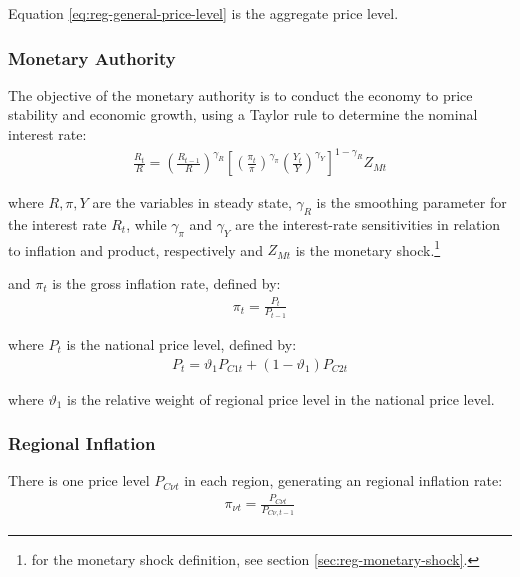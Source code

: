 \documentclass[
thesis.tex
]{subfiles}
\begin{document}
Equation \ref{eq:reg-general-price-level} is the aggregate price level.


\subsubsection{Monetary Authority}

The objective of the monetary authority is to conduct the economy to price stability and economic growth, using a Taylor rule \cite{taylor_discretion_1993} to determine the nominal interest rate:
\begin{align}
	\label{eq:reg-monetary-policy}
	\frac{R_t}{R} =
	\left( \frac{R_{t-1}}{R} \right)^{\gamma_R}  \left[
	\left( \frac{\pi_t}{\pi} \right)^{\gamma_\pi}
	\left( \frac{Y_t}{Y} \right)^{\gamma_Y} \right]^{1-\gamma_R} Z_{Mt}
\end{align}

where $R, \pi, Y$ are the variables in steady state, $\gamma_R$ is the smoothing parameter for the interest rate $R_t$, while $\gamma_\pi$ and $\gamma_Y$ are the interest-rate sensitivities in relation to inflation and product, respectively and $Z_{Mt}$ is the monetary shock.\footnote{for the monetary shock definition, see section \ref{sec:reg-monetary-shock}.}

and $\pi_t$ is the gross inflation rate, defined by:
\begin{align}
	\pi_t = \frac{P_t}{P_{t-1}}
	\label{eq:reg-gross-inflation-rate}
\end{align}

where $P_t$ is the national price level, defined by:
\begin{align}
	P_t = \vartheta_1 P_{C1 t} + (1 -\vartheta_1) P_{C2 t}
	\label{eq:national-price-level}
\end{align}

where $\vartheta_1$ is the relative weight of regional price level in the national price level.

\subsubsection*{Regional Inflation}

There is one price level $P_{C\nu t}$ in each region, generating an regional inflation rate:
\begin{align}
	\pi_{\nu t} = \frac{P_{C\nu t}}{P_{C\nu, t-1}} \label{eq:regional-inflation}
\end{align}
\end{document}
